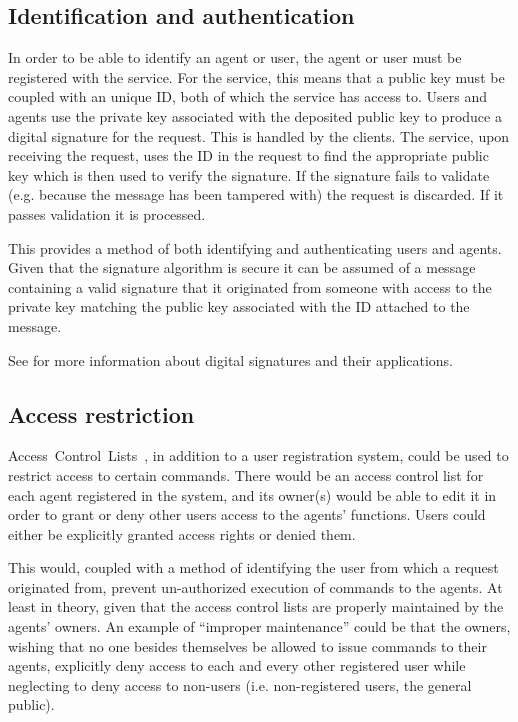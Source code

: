 \subsection{Identification and authentication}
In order to be able to identify an agent or user, the agent or user must be registered with the service.
For the service, this means that a public key must be coupled with an unique ID, both of which the service has access to.
Users and agents use the private key associated with the deposited public key to produce a digital signature for the request.
This is handled by the clients.
The service, upon receiving the request, uses the ID in the request to find the appropriate public key which is then used to verify the signature.
If the signature fails to validate (e.g. because the message has been tampered with) the request is discarded.
If it passes validation it is processed.

This provides a method of both identifying and authenticating users and agents.
Given that the signature algorithm is secure it can be assumed of a message containing a valid signature that it originated from someone with access to the private key matching the public key associated with the ID attached to the message.

See \citet{signatures} for more information about digital signatures and their applications.

\subsection{Access restriction}
Access~Control~Lists~\citep[section 4.1, entry "access control list"]{rfc-acl}, in addition to a user registration system, could be used to restrict access to certain commands.
There would be an access control list for each agent registered in the system, and its owner(s) would be able to edit it in order to grant or deny other users access to the agents' functions.
Users could either be explicitly granted access rights or denied them.

This would, coupled with a method of identifying the user from which a request originated from, prevent un-authorized execution of commands to the agents.
At least in theory, given that the access control lists are properly maintained by the agents' owners.
An example of ``improper maintenance'' could be that the owners, wishing that no one besides themselves be allowed to issue commands to their agents, explicitly deny access to each and every other registered user while neglecting to deny access to non-users (i.e. non-registered users, the general public).


